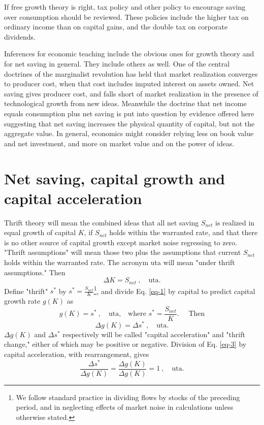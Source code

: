 \documentclass[a4paper,fleqn]{latex_styles/cas-sc}
\begin{document}
If free growth theory is right, tax policy and other policy to encourage
saving over consumption should be reviewed. These policies
include the higher tax on ordinary income than on capital gains, and the
double tax on corporate dividends.

Inferences for economic teaching include the obvious ones for growth
theory and for net saving in general. They include others as well.
One of the central doctrines of the marginalist revolution has held that
market realization converges to producer cost, when that cost includes
imputed interest on assets owned. Net saving gives producer cost,
and falls short of market realization in the presence of technological
growth from new ideas. Meanwhile the doctrine that net income equals
consumption plus net saving is put into question by evidence offered
here suggesting that net saving increases the physical quantity of
capital, but not the aggregate value. In general, economics might
consider relying less on book value and net investment, and more on market value and on the
power of ideas.

\hypertarget{net-saving-and-capital-growth}{%
\section{Net saving, capital growth and capital acceleration}\label{net-saving-and-capital-growth}}

Thrift theory will mean the combined ideas that all net saving \(S_{net}\) is realized in equal growth of capital \(K\), if \(S_{net}\) holds within the warranted rate, and that there is no other source of capital growth except market noise regressing to zero. "Thrift assumptions" will mean those two plus the assumptions that current \(S_{net}\) holds within the warranted rate. The acronym uta will mean "under thrift assumptions." Then 
%
\begin{equation}
    \Delta K = S_{net}\ ,\quad \text{uta}. \label{eq-1}
\end{equation}
%
Define "thrift" \(s^*\) by \(s^* = \frac{S_{net}}{K}\)\footnote{We follow standard practice in dividing flows by stocks of the preceding period, and in neglecting effects of market noise in calculations unless otherwise stated.}, and divide Eq. \eqref{eq-1} by capital to predict capital growth rate \(g(K)\) as
%
\begin{equation}
g(K) = s^* \ , \quad \text{uta,}\quad \text{where } s^* = \frac{S_{net}}{K}.\quad \text{ Then} \label{eq-2}
\end{equation}
%
\vspace{-5ex}
%
\begin{equation}
\Delta g(K) = \Delta s^*\ , \quad \text{uta.} \label{eq-3}
\end{equation}
%
\(\Delta g(K)\) and \(\Delta s^*\) respectively will be called "capital acceleration" and "thrift change," either of which may be positive or negative. Division of Eq. \eqref{eq-3} by capital acceleration, with rearrangement, gives
%
\begin{equation}
\frac{\Delta s^*}{\Delta g(K)} = \frac{\Delta g(K)}{\Delta g(K)} = 1\ , \quad \text{uta}. \label{eq-4}
\end{equation}
%
\end{document}

